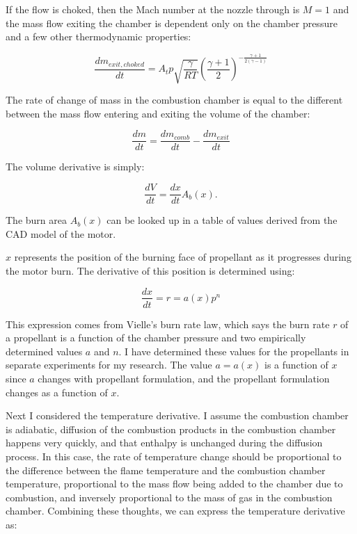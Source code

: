 \documentclass[12pt, letterpaper]{article}
\begin{document}
If the flow is choked, then the Mach number at the nozzle through is $M = 1$ and the mass flow exiting the chamber is dependent only on the chamber pressure and a few other thermodynamic properties:

\begin{equation}
  \frac{dm_{exit, choked}}{dt} = A_t p \sqrt{\frac{\gamma}{R T}}\left( {\frac{\gamma + 1}{2}} \right)^{- \frac{\gamma + 1}{2 (\gamma - 1)}}
\end{equation}

The rate of change of mass in the combustion chamber is equal to the different between the mass flow entering and exiting the volume of the chamber: 

\begin{equation}
  \frac{dm}{dt} = \frac{dm_{comb}}{dt} - \frac{dm_{exit}}{dt}
\end{equation}

The volume derivative is simply:

\begin{equation}
  \frac{dV}{dt} = \frac{dx}{dt} A_b(x) .
\end{equation}

The burn area $A_b(x)$ can be looked up in a table of values derived from the CAD model of the motor. 

$x$ represents the position of the burning face of propellant as it progresses during the motor burn. The derivative of this position is determined using:

\begin{equation}
  \frac{dx}{dt} = r = a(x) p^n
\end{equation}

This expression comes from Vielle's burn rate law, which says the burn rate $r$ of a propellant is a function of the chamber pressure and two empirically determined values $a$ and $n$. I have determined these values for the propellants in separate experiments for my research. The value $a = a(x)$ is a function of $x$ since $a$ changes with propellant formulation, and the propellant formulation changes as a function of $x$. 

Next I considered the temperature derivative. I assume the combustion chamber is adiabatic, diffusion of the combustion products in the combustion chamber happens very quickly, and that enthalpy is unchanged during the diffusion process. In this case, the rate of temperature change should be proportional to the difference between the flame temperature and the combustion chamber temperature, proportional to the mass flow being added to the chamber due to combustion, and inversely proportional to the mass of gas in the combustion chamber. Combining these thoughts, we can express the temperature derivative as:
\end{document}
